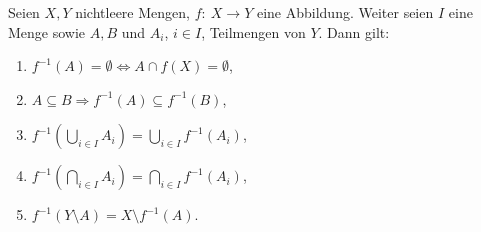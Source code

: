\begin{frame}
\begin{theorem}
Seien $X,Y$ nichtleere Mengen, $f\!:\ X \to Y$ eine Abbildung.
Weiter seien $I$ eine Menge sowie $A,B$ und $A_i$, $i \in I$, Teilmengen von $Y$.
Dann gilt:

\begin{enumerate}
\item $f^{-1}(A) = \emptyset \iff A \cap f(X) = \emptyset$,
\item $A \subseteq B \Rightarrow f^{-1}(A) \subseteq f^{-1}(B)$,
\item $f^{-1}(\bigcup_{i \in I}A_i) = \bigcup_{i \in I}f^{-1}(A_i)$,
\item $f^{-1}(\bigcap_{i \in I}A_i) = \bigcap_{i \in I}f^{-1}(A_i)$,
\item $f^{-1}(Y \setminus A) = X \setminus f^{-1}(A)$.
\end{enumerate}
\end{theorem}
\end{frame}
